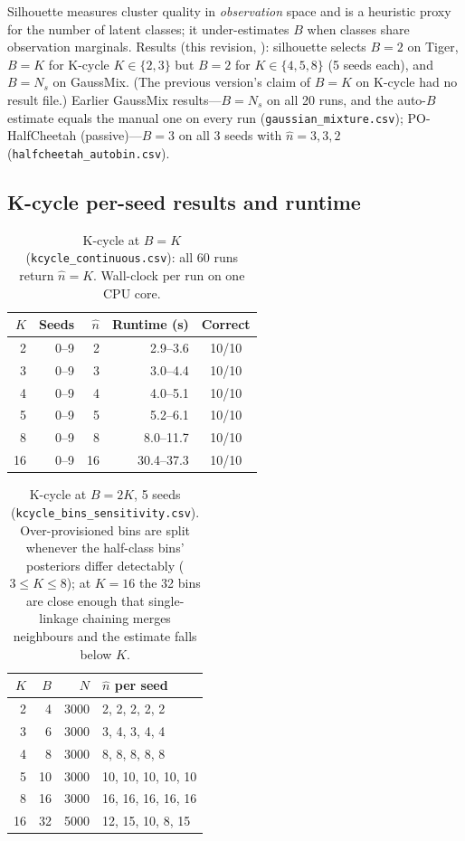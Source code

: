 \documentclass[10pt]{article}
\begin{document}
Silhouette measures cluster quality in \emph{observation} space and is a
heuristic proxy for the number of latent classes; it under-estimates $B$ when
classes share observation marginals.  Results (this revision,
): silhouette selects $B=2$ on Tiger, $B=K$ for K-cycle
$K\in\{2,3\}$ but $B=2$ for $K\in\{4,5,8\}$ (5 seeds each), and $B=N_s$ on GaussMix.
(The previous version's claim of $B=K$ on K-cycle had no result file.)  Earlier
GaussMix results---$B=N_s$ on all 20
runs, and the auto-$B$ estimate equals the manual one on every run
(\texttt{gaussian\_mixture.csv}); PO-HalfCheetah (passive)---$B=3$ on all 3
seeds with $\hat n=3,3,2$ (\texttt{halfcheetah\_autobin.csv}).

\subsection{K-cycle per-seed results and runtime}

\begin{table}[h]
\centering
\caption{K-cycle at $B=K$ (\texttt{kcycle\_continuous.csv}): all 60 runs return
  $\hat n=K$.  Wall-clock per run on one CPU core.}
\begin{tabular}{rrrrc}
\toprule
$K$ & Seeds & $\hat n$ & Runtime (s) & Correct \\
\midrule
2  & 0--9 & 2  & 2.9--3.6   & 10/10 \\
3  & 0--9 & 3  & 3.0--4.4   & 10/10 \\
4  & 0--9 & 4  & 4.0--5.1   & 10/10 \\
5  & 0--9 & 5  & 5.2--6.1   & 10/10 \\
8  & 0--9 & 8  & 8.0--11.7  & 10/10 \\
16 & 0--9 & 16 & 30.4--37.3 & 10/10 \\
\bottomrule
\end{tabular}
\end{table}

\begin{table}[h]
\centering
\caption{K-cycle at $B=2K$, 5 seeds (\texttt{kcycle\_bins\_sensitivity.csv}).
  Over-provisioned bins are split whenever the half-class bins' posteriors
  differ detectably ($3\le K\le8$); at $K=16$ the 32 bins are close enough that
  single-linkage chaining merges neighbours and the estimate falls below $K$.}
\label{tab:kcycle-2k}
\begin{tabular}{rrrl}
\toprule
$K$ & $B$ & $N$ & $\hat n$ per seed \\
\midrule
2 & 4 & 3000 & 2, 2, 2, 2, 2 \\
3 & 6 & 3000 & 3, 4, 3, 4, 4 \\
4 & 8 & 3000 & 8, 8, 8, 8, 8 \\
5 & 10 & 3000 & 10, 10, 10, 10, 10 \\
8 & 16 & 3000 & 16, 16, 16, 16, 16 \\
16 & 32 & 5000 & 12, 15, 10, 8, 15 \\
\bottomrule
\end{tabular}
\end{table}
\end{document}
